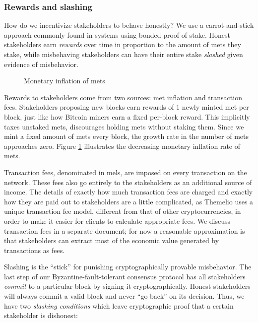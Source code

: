 \documentclass[headinclude]{scrbook}
\begin{document}
\subsubsection{Rewards and slashing}

How do we incentivize stakeholders to behave honestly? We use a carrot-and-stick approach commonly found in systems using bonded proof of stake. Honest stakeholders earn \textit{rewards} over time in proportion to the amount of mets they stake, while misbehaving stakeholders can have their entire stake \textit{slashed} given evidence of misbehavior.

\begin{figure}
    \centering
    \caption{Monetary inflation of mets}
    \label{fig:metinflation}
\end{figure}

Rewards to stakeholders come from two sources: met inflation and transaction fees. Stakeholders proposing new blocks earn rewards of 1 newly minted met per block, just like how Bitcoin miners earn a fixed per-block reward. This implicitly taxes unstaked mets, discourages holding mets without staking them. Since we mint a fixed amount of mets every block, the growth rate in the number of mets approaches zero. Figure \ref{fig:metinflation} illustrates the decreasing monetary inflation rate of mets.

Transaction fees, denominated in mels, are imposed on every transaction on the network. These fees also go entirely to the stakeholders as an additional source of income. The details of exactly how much transaction fees are charged and exactly how they are paid out to stakeholders are a little complicated, as Themelio uses a unique transaction fee model, different from that of other cryptocurrencies, in order to make it easier for clients to calculate appropriate fees. We discuss transaction fees in a separate document; for now a reasonable approximation is that stakeholders can extract most of the economic value generated by transactions as fees.

Slashing is the ``stick'' for punishing cryptographically provable misbehavior. The last step of our Byzantine-fault-tolerant consensus protocol has all stakeholders \emph{commit} to a particular block by signing it cryptographically. Honest stakeholders will always commit a valid block and never ``go back'' on its decision. Thus, we have two \emph{slashing conditions} which leave cryptographic proof that a certain stakeholder is dishonest:
\end{document}
